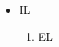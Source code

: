 \documentclass{article}
\begin{document}
\begin{itemize}\item IL \the\linewidth
\begin{enumerate}\item EL \the\linewidth\end{enumerate}
\end{itemize}
\end{document}
